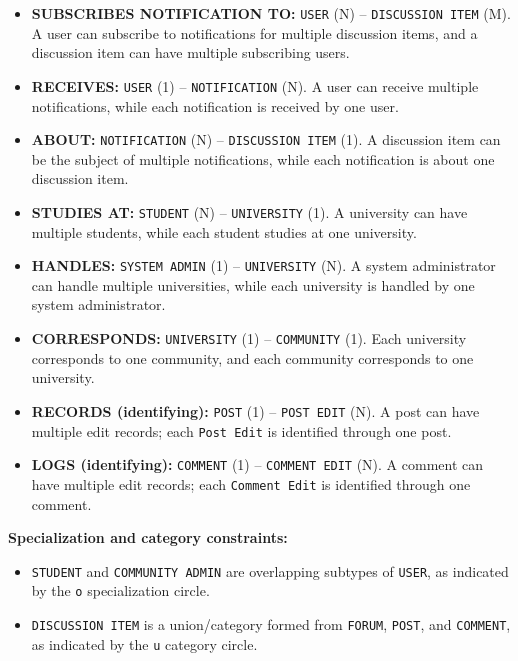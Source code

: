 \begin{itemize}
    \item \textbf{SUBSCRIBES NOTIFICATION TO:} \texttt{USER} (N) -- \texttt{DISCUSSION ITEM} (M). A user can subscribe to notifications for multiple discussion items, and a discussion item can have multiple subscribing users.

    \item \textbf{RECEIVES:} \texttt{USER} (1) -- \texttt{NOTIFICATION} (N). A user can receive multiple notifications, while each notification is received by one user.

    \item \textbf{ABOUT:} \texttt{NOTIFICATION} (N) -- \texttt{DISCUSSION ITEM} (1). A discussion item can be the subject of multiple notifications, while each notification is about one discussion item.

    \item \textbf{STUDIES AT:} \texttt{STUDENT} (N) -- \texttt{UNIVERSITY} (1). A university can have multiple students, while each student studies at one university.

    \item \textbf{HANDLES:} \texttt{SYSTEM ADMIN} (1) -- \texttt{UNIVERSITY} (N). A system administrator can handle multiple universities, while each university is handled by one system administrator.

    \item \textbf{CORRESPONDS:} \texttt{UNIVERSITY} (1) -- \texttt{COMMUNITY} (1). Each university corresponds to one community, and each community corresponds to one university.

    \item \textbf{RECORDS (identifying):} \texttt{POST} (1) -- \texttt{POST EDIT} (N). A post can have multiple edit records; each \texttt{Post Edit} is identified through one post.

    \item \textbf{LOGS (identifying):} \texttt{COMMENT} (1) -- \texttt{COMMENT EDIT} (N). A comment can have multiple edit records; each \texttt{Comment Edit} is identified through one comment.
\end{itemize}

\noindent\textbf{Specialization and category constraints:}
\begin{itemize}
    \item \texttt{STUDENT} and \texttt{COMMUNITY ADMIN} are overlapping subtypes of \texttt{USER}, as indicated by the \texttt{o} specialization circle.
    \item \texttt{DISCUSSION ITEM} is a union/category formed from \texttt{FORUM}, \texttt{POST}, and \texttt{COMMENT}, as indicated by the \texttt{u} category circle.
\end{itemize}

